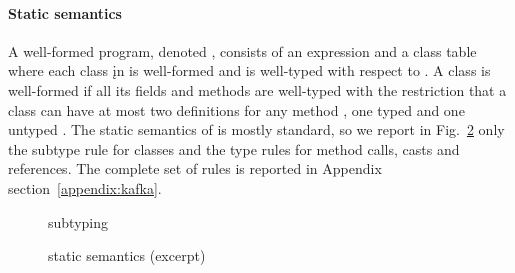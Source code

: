 \documentclass[acmlarge, anonymous, authordraft]{acmart}
\begin{document}
\paragraph{Static semantics}

 A well-formed program, denoted \WFp\e\K, consists of an expression \e and a
class table \K where each class \k in \K is well-formed and \e is well-typed
with respect to \K.  A class is well-formed if all its fields and methods
are well-typed with the restriction that a class can have at most two
definitions for any method \m, one typed \Mdef\m\x\C\D\e and one untyped
\Mdef\m\x\any\any\e.  The static semantics of \kafka is mostly standard,
so we report in Fig.~\ref{f:staticsem} only the subtype rule for classes and the type rules for method calls, casts and references.
The complete
set of rules is reported in Appendix section~\ref{appendix:kafka}.  


\begin{figure}[!t] \hrulefill\small

\begin{mathpar}





\end{mathpar}

\hrulefill
\caption{\kafka subtyping}\label{f:staticsem}
\end{figure}



\begin{figure}[!t] \hrulefill\small

\begin{mathpar}






\end{mathpar}

\hrulefill
\caption{\kafka static semantics (excerpt)}\label{f:staticsem}
\end{figure}
\end{document}
